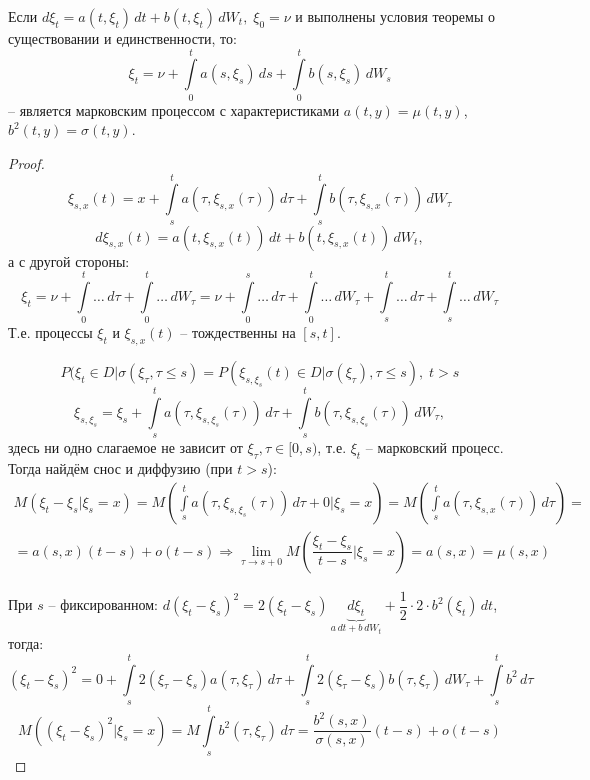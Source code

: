 \begin{theorem}
  Если $d \xi_t = a(t, \xi_t) \, dt + b(t, \xi_t) \, dW_t, \; \xi_0 = \nu$ и
  выполнены условия теоремы о существовании и единственности, то:
  \[
    \xi_t = \nu + \int\limits_0^t a(s, \xi_s) \, ds + \int\limits_0^t b(s, \xi_s) \, dW_s
  \]
  -- является марковским процессом с характеристиками $a(t, y) = \mu(t, y)$, $b^2(t, y) = \sigma(t, y)$.
\end{theorem}
\begin{proof}
  \[
    \xi_{s, x} (t) = x + \int\limits_s^t a(\tau, \xi_{s, x}(\tau)) \, d\tau + \int\limits_s^t b(\tau, \xi_{s, x}(\tau)) \, dW_\tau
  \]
  \[
    d\xi_{s, x}(t) = a(t, \xi_{s, x}(t)) \, dt + b(t, \xi_{s, x}(t)) \, dW_t,
  \]
  а с другой стороны:
  \[
    \xi_t = \nu + \int\limits_0^t \dots \, d\tau + \int\limits_0^t \dots \, dW_\tau =
    \nu + \int\limits_0^s \dots \, d\tau + \int\limits_0^t \dots \, dW_\tau + \int\limits_s^t \dots \, d\tau + \int\limits_s^t \dots \, dW_\tau
  \]
  Т.е. процессы $\xi_t$ и $\xi_{s, x}(t)$ -- тождественны на $[s, t]$.

  \[
    P(\xi_t \in D | \sigma(\xi_\tau, \tau \leqslant s) = P( \xi_{s, \xi_s}(t) \in D | \sigma(\xi_\tau), \tau \leqslant s ), \; t > s
  \]
  \[
    \xi_{s, \xi_s} = \xi_s + \int\limits_s^t a(\tau, \xi_{s, \xi_s}(\tau)) \, d\tau + \int\limits_s^t b(\tau, \xi_{s, \xi_s}(\tau)) \, dW_\tau,
  \]
  здесь ни одно слагаемое не зависит от $\xi_\tau, \tau \in [0, s)$,
  т.е. $\xi_t$ -- марковский процесс. Тогда найдём снос и диффузию (при $t > s$):
  \begin{multline*}
    M( \xi_t - \xi_s | \xi_s = x ) = M \left(\int\limits_s^t a(\tau, \xi_{s, \xi_s}(\tau)) \, d\tau + 0 | \xi_s = x\right) = M\left( \int\limits_s^t a(\tau, \xi_{s, x}(\tau)) \, d\tau\right) = \\
    = a(s, x) (t - s) + o(t-s)
    \Rightarrow \lim_{\tau \to s+0} M \left( \dfrac{\xi_t - \xi_s}{t - s} | \xi_s = x \right) = a(s, x) = \mu(s, x)
  \end{multline*}

  При $s$ -- фиксированном: $d \left( \xi_t - \xi_s \right)^2 = 2 (\xi_t - \xi_s) \, \underbrace{d\xi_t}_{a \, dt + b\, dW_t} + \dfrac{1}{2} \cdot 2 \cdot b^2(\xi_t) \, dt $, тогда:
  \[
    \left( \xi_t - \xi_s \right)^2 = 0 + \int\limits_s^t 2(\xi_\tau - \xi_s) a(\tau, \xi_\tau) \, d\tau + \int\limits_s^t 2(\xi_\tau - \xi_s) b(\tau, \xi_\tau) \, dW_\tau + \int\limits_s^t b^2 \, d\tau
  \]
  \[
    M \left( \left( \xi_t - \xi_s \right)^2 | \xi_s = x \right) = M \int\limits_s^t b^2 (\tau, \xi_\tau) \, d\tau = \dfrac{b^2(s, x)}{\sigma(s, x)}(t - s) + o(t-s)
  \]
\end{proof}

